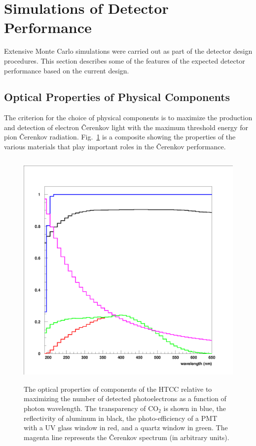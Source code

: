 \section{Simulations of Detector Performance}

Extensive Monte Carlo simulations were carried out as part of the detector
design procedures. This section describes some of the features of the 
expected detector performance based on the current design.

\subsection{Optical Properties of Physical Components}

The criterion for the choice of physical components is to maximize the
production and detection of electron {\v C}erenkov light with the maximum 
threshold energy for pion {\v C}erenkov radiation.  Fig.~\ref{transparancy} 
is a composite showing the properties of the various materials that
play important roles in the {\v C}erenkov performance. 

\begin{figure}[htbp]
\centering
\includegraphics[height=12cm,angle=0]{MC-simulation/nphe_calc.eps}
\caption{\small{The optical properties of components of the HTCC
relative to maximizing the number of detected photoelectrons
as a function of photon wavelength.  The transparency of CO$_2$ is 
shown in blue, the reflectivity of aluminum in black, the photo-efficiency 
of a PMT with a UV glass window in red, and a quartz window in green. 
The magenta line represents the {\v C}erenkov spectrum (in arbitrary 
units).}}
\label{transparancy}
\end{figure}

